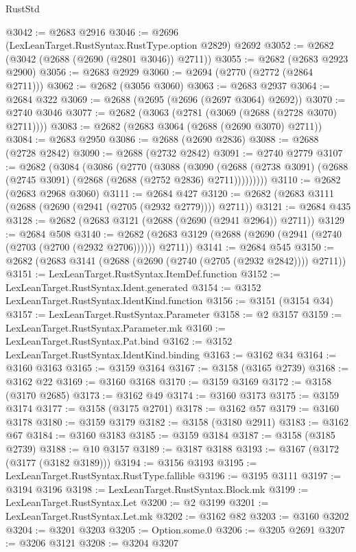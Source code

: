 \begin{lexlean}{RustStd}
\begin{coremodule}
@3042 := @2683 @2916
@3046 := @2696 (LexLeanTarget.RustSyntax.RustType.option @2829) @2692
@3052 := @2682 (@3042 (@2688 (@2690 (@2801 @3046)) @2711))
@3055 := @2682 (@2683 @2923 @2900)
@3056 := @2683 @2929
@3060 := @2694 (@2770 (@2772 (@2864 @2711)))
@3062 := @2682 (@3056 @3060)
@3063 := @2683 @2937
@3064 := @2684 @322
@3069 := @2688 (@2695 (@2696 (@2697 @3064) @2692))
@3070 := @2740 @3046
@3077 := @2682 (@3063 (@2781 (@3069 (@2688 (@2728 @3070) @2711))))
@3083 := @2682 (@2683 @3064 (@2688 (@2690 @3070) @2711))
@3084 := @2683 @2950
@3086 := @2688 (@2690 @2836)
@3088 := @2688 (@2728 @2842)
@3090 := @2688 (@2732 @2842)
@3091 := @2740 @2779
@3107 := @2682
    (@3084
      (@3086
        (@2770
          (@3088
            (@3090
              (@2688 (@2738 @3091) (@2688 (@2745 @3091) (@2868 (@2688 (@2752 @2836) @2711)))))))))
@3110 := @2682 (@2683 @2968 @3060)
@3111 := @2684 @427
@3120 := @2682 (@2683 @3111 (@2688 (@2690 (@2941 (@2705 (@2932 @2779)))) @2711))
@3121 := @2684 @435
@3128 := @2682 (@2683 @3121 (@2688 (@2690 (@2941 @2964)) @2711))
@3129 := @2684 @508
@3140 := @2682 (@2683 @3129 (@2688 (@2690 (@2941 (@2740 (@2703 (@2700 (@2932 @2706)))))) @2711))
@3141 := @2684 @545
@3150 := @2682 (@2683 @3141 (@2688 (@2690 (@2740 (@2705 (@2932 @2842)))) @2711))
@3151 := LexLeanTarget.RustSyntax.ItemDef.function
@3152 := LexLeanTarget.RustSyntax.Ident.generated
@3154 := @3152 LexLeanTarget.RustSyntax.IdentKind.function
@3156 := @3151 (@3154 @34)
@3157 := LexLeanTarget.RustSyntax.Parameter
@3158 := @2 @3157
@3159 := LexLeanTarget.RustSyntax.Parameter.mk
@3160 := LexLeanTarget.RustSyntax.Pat.bind
@3162 := @3152 LexLeanTarget.RustSyntax.IdentKind.binding
@3163 := @3162 @34
@3164 := @3160 @3163
@3165 := @3159 @3164
@3167 := @3158 (@3165 @2739)
@3168 := @3162 @22
@3169 := @3160 @3168
@3170 := @3159 @3169
@3172 := @3158 (@3170 @2685)
@3173 := @3162 @49
@3174 := @3160 @3173
@3175 := @3159 @3174
@3177 := @3158 (@3175 @2701)
@3178 := @3162 @57
@3179 := @3160 @3178
@3180 := @3159 @3179
@3182 := @3158 (@3180 @2911)
@3183 := @3162 @67
@3184 := @3160 @3183
@3185 := @3159 @3184
@3187 := @3158 (@3185 @2739)
@3188 := @10 @3157
@3189 := @3187 @3188
@3193 := @3167 (@3172 (@3177 (@3182 @3189)))
@3194 := @3156 @3193
@3195 := LexLeanTarget.RustSyntax.RustType.fallible
@3196 := @3195 @3111
@3197 := @3194 @3196
@3198 := LexLeanTarget.RustSyntax.Block.mk
@3199 := LexLeanTarget.RustSyntax.Let
@3200 := @2 @3199
@3201 := LexLeanTarget.RustSyntax.Let.mk
@3202 := @3162 @82
@3203 := @3160 @3202
@3204 := @3201 @3203
@3205 := Option.some.{0}
@3206 := @3205 @2691
@3207 := @3206 @3121
@3208 := @3204 @3207

\end{coremodule}
\end{lexlean}
